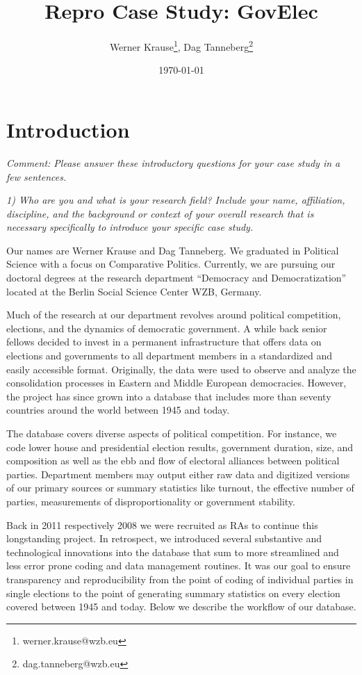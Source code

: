 \documentclass[
  11pt
]{article}
\title{Repro Case Study: GovElec}
\author{Werner Krause\thanks{werner.krause@wzb.eu}, Dag Tanneberg\thanks{dag.tanneberg@wzb.eu}}
\date{\today}
\begin{document}
\maketitle

\thispagestyle{empty}

\clearpage
\setcounter{page}{1}
\onehalfspacing

\section{Introduction}
\textit{Comment: Please answer these introductory questions for your case study in a few sentences.}

\noindent \textit{1) Who are you and what is your research
field? Include your name, affiliation, discipline, and the
background or context of your overall research that is
necessary specifically to introduce your specific case
study.}

Our names are Werner Krause and Dag Tanneberg. We graduated in
Political Science with a focus on Comparative Politics.
Currently, we are pursuing our doctoral degrees at the
research department ``Democracy and Democratization''
located at the Berlin Social Science Center WZB, Germany.

Much of the research at our department revolves around
political competition, elections, and the dynamics of
democratic government. A while back senior fellows decided
to invest in a permanent infrastructure
that offers data on elections and governments to all
department members in a standardized and easily accessible
format. Originally, the data were used to observe and
analyze the consolidation processes in Eastern and Middle
European democracies. However, the project has since grown
into a database that includes more than seventy countries
around the world between 1945 and today.

The database covers diverse aspects of political
competition. For instance, we code lower house and
presidential election results, government duration, size,
and composition as well as the ebb and flow of electoral
alliances between political parties. Department members
may output either raw data and digitized versions of our
primary sources or summary statistics like turnout, the
effective number of parties, measurements of
disproportionality or government stability.

Back in 2011 respectively 2008 we were recruited as RAs to
continue this longstanding project. In retrospect, we
introduced several substantive and technological innovations
into the database that sum to more streamlined and less
error prone coding and data management routines. It was our
goal to ensure transparency and reproducibility from the
point of coding of individual parties in single elections to
the point of generating summary statistics on every election
covered between 1945 and today. Below we describe the
workflow of our database.
\end{document}
